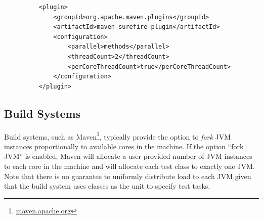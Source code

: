 \begin{figure}[h!]
    \centering
    \lstset{language=XML}
    \begin{lstlisting}
    <plugin>
        <groupId>org.apache.maven.plugins</groupId>
        <artifactId>maven-surefire-plugin</artifactId>
        <configuration>
            <parallel>methods</parallel>
            <threadCount>2</threadCount>
            <perCoreThreadCount>true</perCoreThreadCount>
        </configuration>
    </plugin>
    \end{lstlisting}
    \caption{\label{fig:surefire}}
\end{figure}


\subsection{Build Systems}
Build systems, such as Maven\footnote{\url{maven.apache.org}},
typically provide the option to \emph{fork} JVM instances
proportionally to available cores in the machine.  If the option
``fork JVM'' is enabled, Maven will allocate a user-provided number of
JVM instances to each core in the machine and will allocate each test
class to exactly one JVM.  Note that there is no guarantee to
uniformly distribute load to each JVM given that the build system uses
classes as the unit to specify test tasks.
